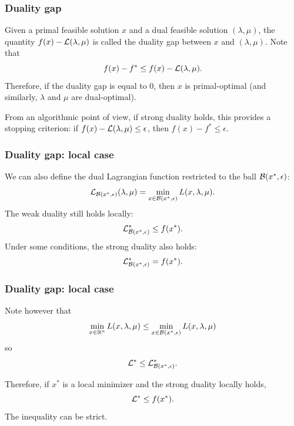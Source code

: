 \documentclass[usepdftitle=false,aspectratio=169]{beamer}
\begin{document}
\begin{frame}
\frametitle{Duality gap}

Given a primal feasible solution $x$ and a dual feasible solution $(\lambda, \mu)$, the quantity $f(x) - {\mathcal{L}}(\lambda, \mu)$ is called the duality gap between $x$ and $(\lambda, \mu)$.
Note that
$$
f(x) - f^* \leq f(x) - {\mathcal{L}}(\lambda, \mu).
$$
Therefore, if the duality gap is equal to 0, then $x$ is primal-optimal (and similarly, $\lambda$ and $\mu$ are dual-optimal).

\mbox{}

From an algorithmic point of view, if strong duality holds, this provides a stopping criterion: if $f(x) - {\mathcal{L}}(\lambda, \mu) \leq \epsilon$, then $f(x) - f^* \leq \epsilon$.

\end{frame}

\begin{frame}
\frametitle{Duality gap: local case}

We can also define the dual Lagrangian function restricted to the ball ${\mathcal{B}}(x^*, \epsilon)$:
$$
{\mathcal{L}}_{{\mathcal{B}}(x^*, \epsilon)}(\lambda, \mu) = \min_{x \in {\mathcal{B}}(x^*, \epsilon)} L(x,\lambda, \mu).
$$
The weak duality still holds locally:
$$
{\mathcal{L}}^*_{{\mathcal{B}}(x^*, \epsilon)} \leq f(x^*).
$$
Under some conditions, the strong duality also holds:
$$
{\mathcal{L}}^*_{{\mathcal{B}}(x^*, \epsilon)} = f(x^*).
$$

\end{frame}

\begin{frame}
\frametitle{Duality gap: local case}

Note however that
$$
\min_{x \in \mathbb{R}^n} L(x, \lambda, \mu) 
\leq \min_{x \in {\mathcal{B}}(x^*, \epsilon)} L(x, \lambda, \mu) 
$$
so
$$
{\mathcal{L}}^* \leq {\mathcal{L}}^*_{{\mathcal{B}}(x^*, \epsilon)}.
$$

\mbox{}

Therefore, if $x^*$ is a local minimizer and the strong duality locally holds,
$$
{\mathcal{L}}^* \leq f(x^*).
$$
The inequality can be strict.

\end{frame}
\end{document}
